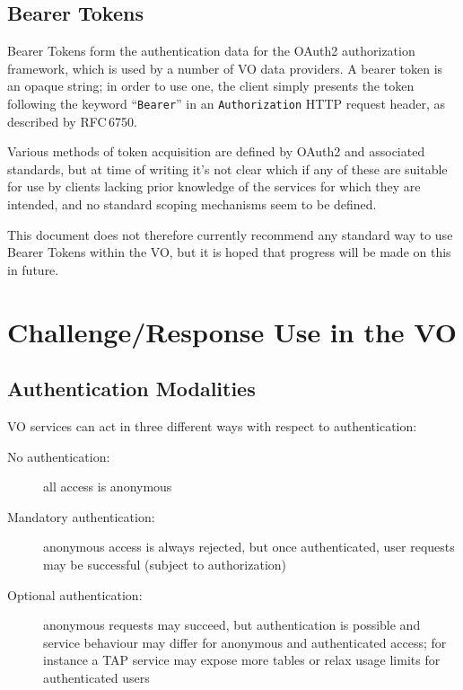 \documentclass[11pt,a4paper]{ivoa}
\newcommand{\rfc}[1]{RFC\,#1}
\newcommand{\header}[1]{{\tt #1}}
\begin{document}


\subsection{Bearer Tokens}

Bearer Tokens form the authentication data for
the OAuth2 authorization framework,
which is used by a number of VO data providers.
A bearer token is an opaque string;
in order to use one, the client simply presents the token
following the keyword ``{\tt Bearer}''
in an \header{Authorization} HTTP request header,
as described by \rfc{6750}.

Various methods of token acquisition are defined by OAuth2 and
associated standards, but at time of writing it's not clear which if
any of these are suitable for use by clients lacking prior knowledge
of the services for which they are intended,
and no standard scoping mechanisms seem to be defined.

This document does not therefore currently recommend any standard way
to use Bearer Tokens within the VO, but it is hoped that
progress will be made on this in future.



\section{Challenge/Response Use in the VO}

\subsection{Authentication Modalities}
\label{sec:modalities}

VO services can act in three different ways with respect to authentication:
\begin{description}
  \item[No authentication:]
       all access is anonymous
  \item[Mandatory authentication:]
       anonymous access is always rejected, but once authenticated,
       user requests may be successful (subject to authorization)
  \item[Optional authentication:]
       anonymous requests may succeed, but authentication is possible
       and service behaviour may differ for anonymous and authenticated access;
       for instance a TAP service may expose more tables or relax
       usage limits for authenticated users
\end{description}
\end{document}
